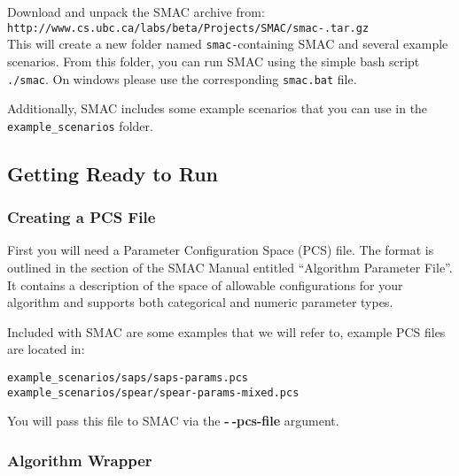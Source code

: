 \documentclass[11pt,letterpaper,twoside]{article}
\begin{document}
Download and unpack the SMAC archive from:\\

\smaller
\texttt{http://www.cs.ubc.ca/labs/beta/Projects/SMAC/smac-\version\unskip.tar.gz} 
\larger \\

This will create a new folder named \texttt{smac-\version}containing SMAC and several example scenarios. 
From this folder, you can run SMAC using the simple bash script \texttt{./smac}.  On windows please use the corresponding \texttt{smac.bat} file.

Additionally, SMAC includes some example scenarios that you can use in the  \texttt{example\_scenarios} folder.

\subsection{Getting Ready to Run}
\subsubsection{Creating a PCS File}

First you will need a Parameter Configuration Space (PCS) file. The format is outlined in the section of the SMAC Manual entitled ``Algorithm Parameter File''.  It contains a description of the space
of allowable configurations for your algorithm and supports both categorical and numeric parameter types.

Included with SMAC are some examples that we will refer to, example PCS files are located in:
{\footnotesize
\begin{alltt}
example_scenarios/saps/saps-params.pcs
example_scenarios/spear/spear-params-mixed.pcs
\end{alltt}}

You will pass this file to SMAC via the \textbf{-$~\!$-pcs-file} argument.

\subsubsection{Algorithm Wrapper}
\end{document}
